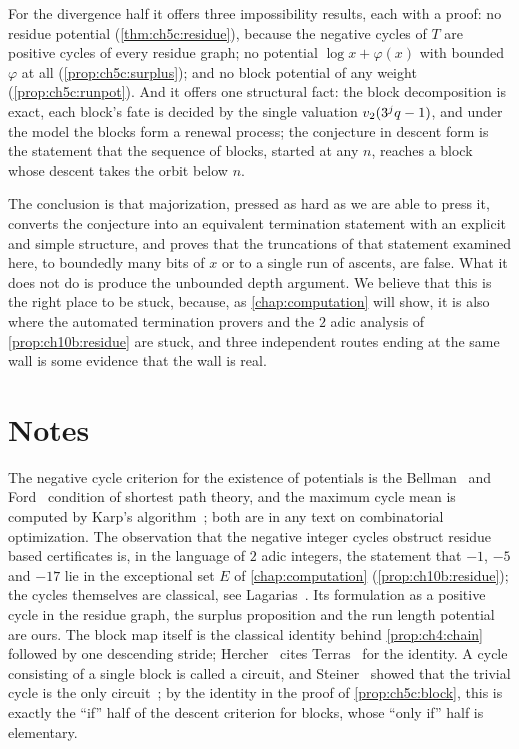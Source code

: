 For the divergence half it offers three impossibility results, each with a
proof: no residue potential (\cref{thm:ch5c:residue}), because the negative
cycles of $T$ are positive cycles of every residue graph; no potential $\log x+\varphi(x)$ with bounded $\varphi$
at all (\cref{prop:ch5c:surplus}); and no block potential of any weight
(\cref{prop:ch5c:runpot}). And it offers one structural fact: the block
decomposition is exact, each block's fate is
decided by the single valuation $v_2(3^jq-1)$, and under the model the blocks
form a renewal process; the conjecture in descent
form is the statement that the sequence of blocks, started at any $n$,
reaches a block whose descent takes the orbit below $n$.

The conclusion is that majorization, pressed as hard as we are able to
press it, converts the conjecture into an equivalent termination statement with
an explicit and simple structure, and proves that the truncations of that
statement examined here, to boundedly many bits of $x$ or to a single run of
ascents, are false. What it does not do is produce the
unbounded depth argument. We believe that this is the right place to be stuck,
because, as \cref{chap:computation} will show, it is also where the automated termination provers and the $2$ adic analysis of \cref{prop:ch10b:residue}
are stuck, and three independent routes ending at the same wall is some
evidence that the wall is real.

\section*{Notes}

The negative cycle criterion for the existence of potentials is the
Bellman~\cite{bellman1958} and Ford~\cite{ford1956} condition of shortest path theory, and the maximum cycle mean
is computed by Karp's algorithm~\cite{karp1978}; both are in any text on combinatorial
optimization. The observation that the negative integer cycles obstruct residue
based certificates is, in the language of $2$ adic integers, the statement that $-1$, $-5$ and $-17$ lie in the exceptional set $E$ of \cref{chap:computation} (\cref{prop:ch10b:residue}); the cycles themselves are classical, see Lagarias~\cite{lagarias1985}.
Its formulation as a positive cycle in the residue graph, the surplus proposition and the run length potential are ours.
The block map
itself is the classical identity behind \cref{prop:ch4:chain} followed by one
descending stride; Hercher~\cite[Lemma~8]{hercher2023} cites
Terras~\cite{terras1976} for the identity.
A cycle consisting of a single block is called a circuit, and Steiner~\cite{steiner1977} showed that the trivial cycle is the only circuit~\cite[Theorem~J]{lagarias1985}; by the identity in the proof of \cref{prop:ch5c:block}, this is exactly the ``if'' half of the descent criterion for blocks, whose ``only if'' half is elementary.

